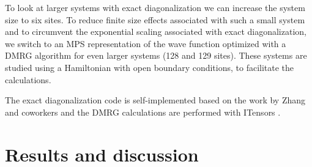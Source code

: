 \documentclass[twoside,twocolumn,9pt]{article}
\begin{document}
To look at larger systems with exact diagonalization we can increase the system size to six sites. To reduce finite size effects associated with such a small system and to circumvent the exponential scaling associated with exact diagonalization, we switch to an MPS representation of the wave function optimized with a DMRG algorithm for even larger systems (128 and 129 sites). These systems are studied using a Hamiltonian with open boundary conditions, to facilitate the calculations.

The exact diagonalization code is self-implemented \cite{github} based on the work by Zhang and coworkers \cite{zhang2010} and the DMRG calculations are performed with ITensors \cite{Fishman2022}.

\section{Results and discussion}
\end{document}
